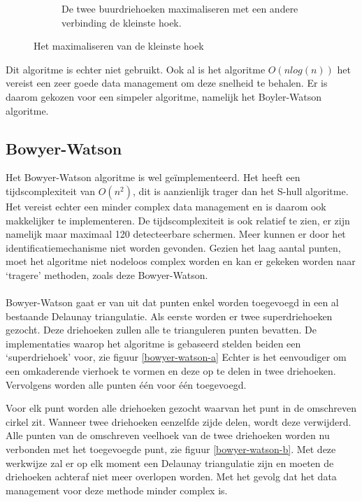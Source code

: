 \begin{figure}
\begin{subfigure}{0.4\textwidth}
		\caption{De twee buurdriehoeken maximaliseren met een andere verbinding de kleinste hoek.}
	\end{subfigure}
	\caption{Het maximaliseren van de kleinste hoek \cite{delaunaywiki}}
	\label{driehoekswitch}
\end{figure}

Dit algoritme is echter niet gebruikt. Ook al is het algoritme $O(nlog(n))$ het vereist een zeer goede data management om deze snelheid te behalen.  \cite{Lund2014} Er is daarom gekozen voor een simpeler algoritme, namelijk het Boyler-Watson algoritme.

\subsection{Bowyer-Watson}
Het Bowyer-Watson algoritme is wel geïmplementeerd. Het heeft een tijdscomplexiteit van $O(n^2)$, dit is aanzienlijk trager dan het S-hull algoritme. \cite{Bowyer-WatsonWiki} Het vereist echter een minder complex data management en is daarom ook makkelijker te implementeren. De tijdscomplexiteit is ook relatief te zien, er zijn namelijk maar maximaal 120 detecteerbare schermen. Meer kunnen er door het identificatiemechanisme niet worden gevonden. Gezien het laag aantal punten, moet het algoritme niet nodeloos complex worden en kan er gekeken worden naar `tragere' methoden, zoals deze Bowyer-Watson.

\paragraph{}
Bowyer-Watson gaat er van uit dat punten enkel worden toegevoegd in een al bestaande Delaunay triangulatie. Als eerste worden er twee superdriehoeken gezocht. Deze driehoeken zullen alle te trianguleren punten bevatten. De implementaties waarop het algoritme is gebaseerd \cite{Bowyer-WatsonWiki} \cite{bowyer-watsonImplementation} stelden beiden een `superdriehoek' voor, zie figuur \ref{bowyer-watson-a} Echter is het eenvoudiger om een omkaderende vierhoek te vormen en deze op te delen in twee driehoeken. Vervolgens worden alle punten één voor één toegevoegd.

Voor elk punt worden alle driehoeken gezocht waarvan het punt in de omschreven cirkel zit. Wanneer twee driehoeken eenzelfde zijde delen, wordt deze verwijderd. Alle punten van de omschreven veelhoek van de twee driehoeken worden nu verbonden met het toegevoegde punt, zie figuur \ref{bowyer-watson-b}. Met deze werkwijze zal er op elk moment een Delaunay triangulatie zijn en moeten de driehoeken achteraf niet meer overlopen worden. Met het gevolg dat het data management voor deze methode minder complex is.

